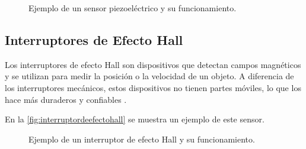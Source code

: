 \begin{figure}[h!]
	\centering
	\caption{Ejemplo de un sensor piezoeléctrico y su funcionamiento.}
	\label{fig:piezoelectricos}
\end{figure}




\subsection{Interruptores de Efecto Hall}
Los interruptores de efecto Hall son dispositivos que detectan campos magnéticos y se utilizan para medir la posición o la velocidad de un objeto. A diferencia de los interruptores mecánicos, estos dispositivos no tienen partes móviles, lo que los hace más duraderos y confiables \cite{EfectoHall}.

En la \autoref{fig:interruptordeefectohall} se muestra un ejemplo de este sensor.

\begin{figure}[h!]
	\centering
	\caption{Ejemplo de un interruptor de efecto Hall y su funcionamiento.}
	\label{fig:interruptordeefectohall}
\end{figure}